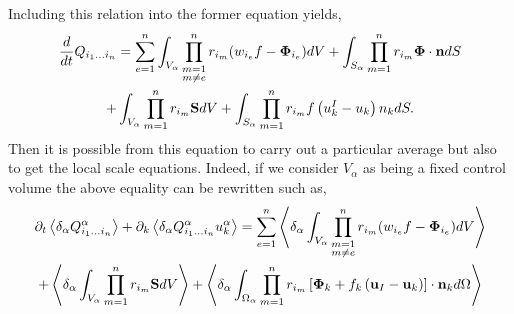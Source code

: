 Including this relation into the former equation yields, 
\begin{multline*}
    \frac{d}{d t} Q_{i_1\ldots i_n}
    = \sum_{e=1}^{n} \int_{V_\alpha} \prod^{n}_{\substack{ m=1 \\   m \neq e}} r_{i_m} (w_{i_e}f  - \mathbf{\Phi}_{i_e})dV
    +\int_{S_\alpha} \prod_{m=1}^{n} r_{i_m} \mathbf{\Phi} \cdot \textbf{n}dS\\
    + \int_{V_\alpha} \prod_{m=1}^{n} r_{i_m} \textbf{S} dV
    +\int_{S_\alpha} \prod_{m=1}^{n} r_{i_m} f \left(u^I_k - u_k\right) n_k dS.
\end{multline*}
Then it is possible from this equation to carry out a particular average but also to get the local scale equations. 
Indeed, if we consider $V_\alpha$ as being a fixed control volume the above equality can be rewritten such as, 
\begin{multline*}
    \partial_t \left<\delta_\alpha Q_{i_1\ldots i_n}^\alpha\right>
    + \partial_k  \left<\delta_\alpha Q_{i_1\ldots i_n}^\alpha u_k^\alpha\right>
    = \sum_{e=1}^{n} \left<\delta_\alpha \int_{V_\alpha} \prod^{n}_{\substack{ m=1 \\   m \neq e}} r_{i_m} (w_{i_e}f  - \mathbf{\Phi}_{i_e})dV\right>\\
    + \left<\delta_\alpha \int_{V_\alpha} \prod_{m=1}^{n} r_{i_m} \textbf{S} dV\right>
    + \left<\delta_\alpha \int_{\Omega_\alpha} \prod_{m=1}^{n} r_{i_m} \left[
            \mathbf{\Phi}_k
            + f_k
            \left(
                \textbf{u}_I
                - \textbf{u}_k
            \right)
        \right]
        \cdot \textbf{n}_kd\Omega\right>
\end{multline*}
